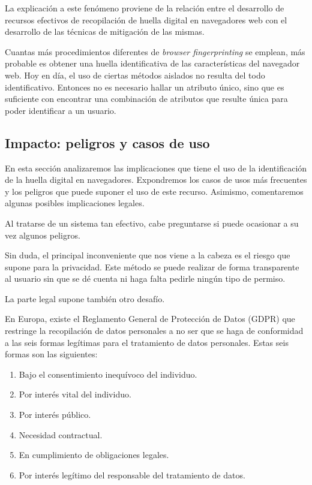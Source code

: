La explicación a este fenómeno proviene de la relación entre el desarrollo de recursos efectivos de recopilación de huella digital en navegadores web con el desarrollo de las técnicas de mitigación de las mismas. \par 

Cuantas más procedimientos diferentes de \textit{browser fingerprinting} se emplean, más probable es obtener una huella identificativa de las características del navegador web. Hoy en día, el uso de ciertas métodos aislados no resulta del todo identificativo. Entonces no es necesario hallar un atributo único, sino que es suficiente con encontrar una combinación de atributos que resulte única para poder identificar a un usuario. \par

\subsection{Impacto: peligros y casos de uso}

En esta sección analizaremos las implicaciones que tiene el uso de la identificación de la huella digital en navegadores. Expondremos los casos de usos más frecuentes y los peligros que puede suponer el uso de este recurso. Asimismo, comentaremos algunas posibles implicaciones legales. \par

Al tratarse de un sistema tan efectivo, cabe preguntarse si puede ocasionar a su vez algunos peligros. \par

Sin duda, el principal inconveniente que nos viene a la cabeza es el riesgo que supone para la privacidad. Este método se puede realizar de forma transparente al usuario sin que se dé cuenta ni haga falta pedirle ningún tipo de permiso\cite{challenges}. \par 

La parte legal supone también otro desafío. \par

En Europa, existe el Reglamento General de Protección de Datos (GDPR) que restringe la recopilación de datos personales a no ser que se haga de conformidad a las seis formas legítimas para el tratamiento de datos personales. Estas seis formas son las siguientes: \par

\begin{enumerate}
\item Bajo el consentimiento inequívoco del individuo.
\item Por interés vital del individuo.
\item Por interés público.
\item Necesidad contractual.
\item En cumplimiento de obligaciones legales.
\item Por interés legítimo del responsable del tratamiento de datos.
\end{enumerate}

